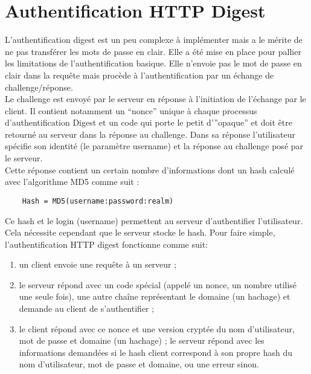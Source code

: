 \section*{Authentification HTTP Digest}
L’authentification digest est un peu  complexe à implémenter mais a le mérite de ne pas transférer les mots de passe en clair. Elle a été mise en place pour pallier les limitations de l’authentification basique. Elle n’envoie pas le mot de passe en clair dans la requête mais procède à l’authentification par un échange de challenge/réponse.\\
Le challenge est envoyé par le serveur en réponse à l’initiation de l’échange par le client. Il contient notamment un “nonce” unique à chaque processus d’authentification Digest et un code qui porte le petit d’”opaque” et doit être retourné au serveur dans la réponse au challenge. Dans sa réponse l’utilisateur spécifie son identité (le paramètre username) et la réponse au challenge posé par le serveur. \\
Cette réponse contient un certain nombre d’informations dont un hash calculé avec l'algorithme MD5 comme suit :
\begin{verbatim}
	Hash = MD5(username:password:realm)
\end{verbatim}
Ce hash et le login (username) permettent au serveur d’authentifier l’utilisateur. Cela nécessite cependant que le serveur stocke le hash.
Pour faire simple, l'authentification HTTP digest fonctionne comme suit:
\begin{enumerate}
	\item un client envoie une requête à un serveur ; 
	\item le serveur répond avec un code spécial (appelé un nonce, un nombre utilisé une seule fois), une autre chaîne représentant le domaine (un hachage) et demande au client de s'authentifier ;
	\item le client répond avec ce nonce et une version cryptée du nom d'utilisateur, mot de passe et domaine (un hachage) ;
	\itemcheck le serveur répond avec les informations demandées si le hash client correspond à son propre hash du nom d'utilisateur, mot de passe et domaine, ou une erreur sinon.
\end{enumerate}



